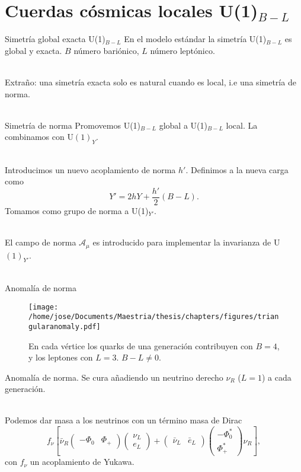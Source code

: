 \documentclass[14pt]{beamer}
\begin{document}
\section{Cuerdas cósmicas locales U(1)$_{B-L}$}
\begin{frame}{Simetría global exacta U(1)$_{B-L}$}
En el modelo estándar la simetría U(1)$_{B-L}$ es global y exacta. $B$ número bariónico, $L$ número leptónico.\\~\

Extraño: una simetría exacta solo es natural cuando es local, i.e una simetría de norma. \\~\
\end{frame}

\begin{frame}{Simetría de norma}
Promovemos U(1)$_{B-L}$ global a U(1)$_{B-L}$ local. La combinamos con U$(1)_Y$. \\~\

Introducimos un nuevo acoplamiento de norma $h'$. Definimos a la nueva carga como
	$$Y' = 2hY + \frac{h'}{2}(B-L).$$
Tomamos como grupo de norma a U(1)$_{Y'}$.\\~\

El campo de norma $\mathcal{A}_{\mu}$ es introducido para implementar la invarianza de U$(1)_{Y'}$. \\~\

\end{frame}




\begin{frame}{Anomalía de norma}
\begin{figure}
\texttt{[image: /home/jose/Documents/Maestria/thesis/chapters/figures/triangularanomaly.pdf]}

\caption{En cada vértice  los quarks de una generación contribuyen con $B=4$, y los leptones con $L=3$. $B-L\neq 0$.}
\end{figure}
\centering

\end{frame}

\begin{frame}%

Anomalía de norma. Se cura añadiendo un neutrino derecho $\nu_R$ ($L=1$) a cada generación. \\~\

Podemos dar masa a los neutrinos con un término masa de Dirac
$$ f_{\nu} \left[\bar{\nu}_R \begin{pmatrix}-\Phi_0 & \Phi_+\end{pmatrix}\begin{pmatrix}
	\nu_L \\
	e_L
\end{pmatrix} + \begin{pmatrix}\bar{\nu}_L & \bar{e}_L\end{pmatrix}
\begin{pmatrix}
	-\Phi^*_0 \\
	\Phi^*_+
\end{pmatrix}\nu_R\right], $$
con $f_{\nu}$ un acoplamiento de Yukawa.

\end{frame}
\end{document}
